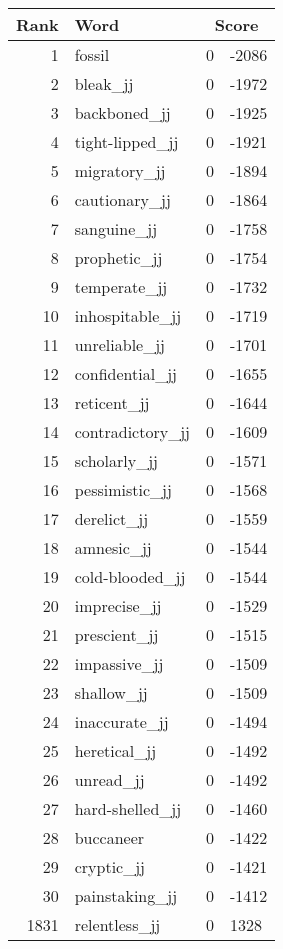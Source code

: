 \begin{longtable}[!htbp]{| rlr@{.}l |}
    \hline
    \textbf{Rank} & \textbf{Word} & \multicolumn{2}{c|}{\textbf{Score}} \\
    \hline
    \endhead
    1 & fossil & 0 & -2086 \\
    2 & bleak\_jj & 0 & -1972 \\
    3 & backboned\_jj & 0 & -1925 \\
    4 & tight-lipped\_jj & 0 & -1921 \\
    5 & migratory\_jj & 0 & -1894 \\
    6 & cautionary\_jj & 0 & -1864 \\
    7 & sanguine\_jj & 0 & -1758 \\
    8 & prophetic\_jj & 0 & -1754 \\
    9 & temperate\_jj & 0 & -1732 \\
    10 & inhospitable\_jj & 0 & -1719 \\
    11 & unreliable\_jj & 0 & -1701 \\
    12 & confidential\_jj & 0 & -1655 \\
    13 & reticent\_jj & 0 & -1644 \\
    14 & contradictory\_jj & 0 & -1609 \\
    15 & scholarly\_jj & 0 & -1571 \\
    16 & pessimistic\_jj & 0 & -1568 \\
    17 & derelict\_jj & 0 & -1559 \\
    18 & amnesic\_jj & 0 & -1544 \\
    19 & cold-blooded\_jj & 0 & -1544 \\
    20 & imprecise\_jj & 0 & -1529 \\
    21 & prescient\_jj & 0 & -1515 \\
    22 & impassive\_jj & 0 & -1509 \\
    23 & shallow\_jj & 0 & -1509 \\
    24 & inaccurate\_jj & 0 & -1494 \\
    25 & heretical\_jj & 0 & -1492 \\
    26 & unread\_jj & 0 & -1492 \\
    27 & hard-shelled\_jj & 0 & -1460 \\
    28 & buccaneer & 0 & -1422 \\
    29 & cryptic\_jj & 0 & -1421 \\
    30 & painstaking\_jj & 0 & -1412 \\
    1831 & relentless\_jj & 0 & 1328 \\

\end{longtable}
